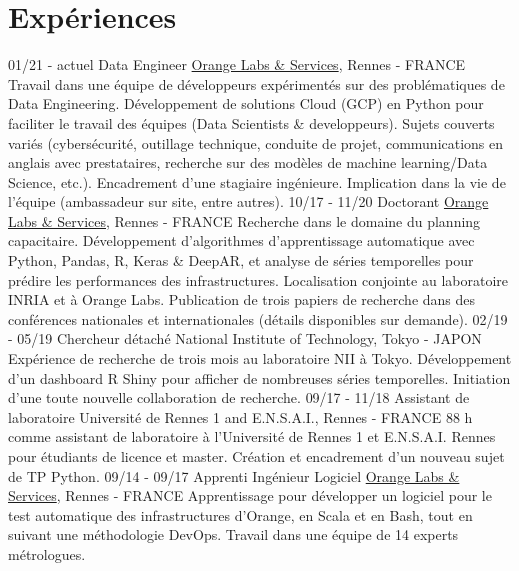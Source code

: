 \documentclass[]{friggeri-cv}
\begin{document}
\section{Expériences}
\begin{entrylist}
  \entry
  {01/21 - actuel}
  {Data Engineer}
  {\href{http://www.orange.com/en/home}{Orange Labs \& Services}, Rennes - FRANCE}
  {
    Travail dans une équipe de développeurs expérimentés sur des problématiques de Data Engineering. 
    Développement de solutions Cloud (GCP) en Python pour faciliter le travail des équipes (Data Scientists \& developpeurs).
    Sujets couverts variés (cybersécurité, outillage technique, conduite de projet, communications en anglais avec prestataires, recherche sur des modèles de machine learning/Data Science, etc.). 
    Encadrement d’une stagiaire ingénieure. Implication dans la vie de l’équipe (ambassadeur sur site, entre autres).  
  }
  \entry
    {10/17 - 11/20}
    {Doctorant}
    {\href{http://www.orange.com/en/home}{Orange Labs \& Services}, Rennes - FRANCE}
    {
    Recherche dans le domaine du planning capacitaire.
    Développement d’algorithmes d’apprentissage automatique avec Python, Pandas, R, Keras \& DeepAR, et analyse de séries temporelles pour prédire les performances des infrastructures.
    Localisation conjointe au laboratoire INRIA et à Orange Labs.
    Publication de trois papiers de recherche dans des conférences nationales et internationales (détails disponibles sur demande).
    }
  \entry
    {02/19 - 05/19}
    {Chercheur détaché}
    {National Institute of Technology, Tokyo - JAPON}
    {Expérience de recherche de trois mois au laboratoire NII à Tokyo.
    Développement d'un dashboard R Shiny pour afficher de nombreuses séries temporelles.
    Initiation d'une toute nouvelle collaboration de recherche.
    }
  \entry
    {09/17 - 11/18}
    {Assistant de laboratoire}
    {Université de Rennes 1 and E.N.S.A.I., Rennes - FRANCE}
    {88 h comme assistant de laboratoire à l'Université de Rennes 1 et E.N.S.A.I. Rennes pour étudiants de licence et master.
    Création et encadrement d'un nouveau sujet de TP Python.%
    }
  \entry
    {09/14 - 09/17}
    {Apprenti Ingénieur Logiciel}
    {\href{http://www.orange.com/en/home}{Orange Labs \& Services}, Rennes - FRANCE}
    {Apprentissage pour développer un logiciel pour le test automatique des infrastructures d’Orange, en Scala et en Bash, tout en suivant une méthodologie DevOps. Travail dans une équipe de 14 experts métrologues. 
}
\end{entrylist}
\end{document}

